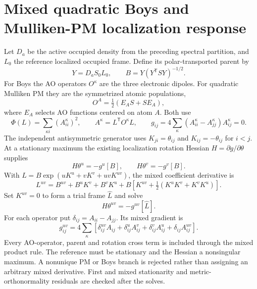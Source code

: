 \documentclass[11pt]{article}
\begin{document}
\section{Mixed quadratic Boys and Mulliken-PM localization response}
Let $D_a$ be the active occupied density from the preceding spectral
partition, and $L_0$ the reference localized occupied frame. Define its
polar-transported parent by
\begin{equation}
 Y=D_a S_0 L_0,\qquad B=Y(Y^{\mathsf T}S Y)^{-1/2}.
\end{equation}
For Boys the AO operators $O^\kappa$ are the three electronic dipoles.
For quadratic Mulliken PM they are the symmetrized atomic populations,
\begin{equation}
 O^A=\tfrac12(E_A S+S E_A),
\end{equation}
where $E_A$ selects AO functions centered on atom $A$. Both use
\begin{equation}
 \Phi(L)=\sum_{\kappa i}(A^\kappa_{ii})^2,\qquad
 A^\kappa=L^{\mathsf T}O^\kappa L,\qquad
 g_{ij}=4\sum_\kappa(A^\kappa_{ii}-A^\kappa_{jj})A^\kappa_{ij}=0.
\end{equation}
The independent antisymmetric generator uses $K_{ji}=\theta_{ij}$ and
$K_{ij}=-\theta_{ij}$ for $i<j$. At a stationary maximum the existing
localization rotation Hessian $H=\partial g/\partial\theta$ supplies
\begin{equation}
 H\theta^u=-g^u[B],\qquad H\theta^v=-g^v[B].
\end{equation}
With $L=B\exp(uK^u+vK^v+uvK^{uv})$, the mixed coefficient derivative is
\begin{equation}
 L^{uv}=B^{uv}+B^uK^v+B^vK^u
             +B\left[K^{uv}+\tfrac12(K^uK^v+K^vK^u)\right].
\end{equation}
Set $K^{uv}=0$ to form a trial frame $\widehat L$ and solve
\begin{equation}
 H\theta^{uv}=-g^{uv}[\widehat L].
\end{equation}
For each operator put $\delta_{ij}=A_{ii}-A_{jj}$. Its mixed gradient is
\begin{equation}
 g_{ij}^{uv}=4\sum_\kappa\left[
 \delta_{ij}^{uv}A_{ij}+\delta_{ij}^u A_{ij}^v
 +\delta_{ij}^v A_{ij}^u+\delta_{ij}A_{ij}^{uv}\right].
\end{equation}
Every AO-operator, parent and rotation cross term is included through the
mixed product rule. The reference must be stationary and the Hessian a
nonsingular maximum. A nonunique PM or Boys branch is rejected rather
than assigning an arbitrary mixed derivative. First and mixed stationarity
and metric-orthonormality residuals are checked after the solves.
\end{document}
